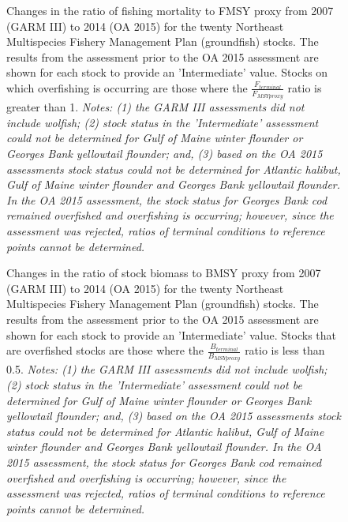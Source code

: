 	\begin{figure}
		\centering	
		\captionsetup{singlelinecheck=off}
		\caption[.]{Changes in the ratio of fishing mortality to FMSY proxy from 2007 (GARM III) to 2014 (OA 2015) for the twenty Northeast Multispecies Fishery Management Plan (groundfish) stocks. The results from the assessment prior to the OA 2015 assessment are shown for each stock to provide an 'Intermediate' value. Stocks on which overfishing is occurring are those where the $\frac{F_{terminal}}{F_{MSY{}proxy}}$ ratio is greater than 1. \textit{Notes: (1) the GARM III assessments did not include wolfish; (2) stock status in the 'Intermediate' assessment could not be determined for Gulf of Maine winter flounder or Georges Bank yellowtail flounder; and, (3) based on the OA 2015 assessments stock status could not be determined for Atlantic halibut, Gulf of Maine winter flounder and Georges Bank yellowtail flounder. In the OA 2015 assessment, the stock status for Georges Bank cod remained overfished and overfishing is occurring; however, since the assessment was rejected, ratios of terminal conditions to reference points cannot be determined.}}		
		\label{propFmsy}
	\end{figure}
	\clearpage



	\begin{figure}
		\centering	
		\captionsetup{singlelinecheck=off}
		\caption[.]{Changes in the ratio of stock biomass to BMSY proxy from 2007 (GARM III) to 2014 (OA 2015) for the twenty Northeast Multispecies Fishery Management Plan (groundfish) stocks. The results from the assessment prior to the OA 2015 assessment are shown for each stock to provide an 'Intermediate' value. Stocks that are overfished stocks are those where the $\frac{B_{terminal}}{B_{MSY{}proxy}}$ ratio is less than 0.5. \textit{Notes: (1) the GARM III assessments did not include wolfish; (2) stock status in the 'Intermediate' assessment could not be determined for Gulf of Maine winter flounder or Georges Bank yellowtail flounder; and, (3) based on the OA 2015 assessments stock status could not be determined for Atlantic halibut, Gulf of Maine winter flounder and Georges Bank yellowtail flounder. In the OA 2015 assessment, the stock status for Georges Bank cod remained overfished and overfishing is occurring; however, since the assessment was rejected, ratios of terminal conditions to reference points cannot be determined.}}		
		\label{propBmsy}
	\end{figure}
	\clearpage


